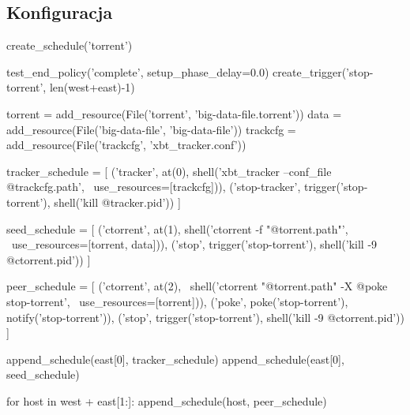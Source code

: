 \documentclass[00-praca-magisterska.tex]{subfiles}
\begin{document}

\subsection{Konfiguracja}


\begin{pythoncode}
  create_schedule('torrent')
    
  test_end_policy('complete', setup_phase_delay=0.0)
  create_trigger('stop-torrent', len(west+east)-1)
\end{pythoncode}

\begin{pythoncode}
  torrent = add_resource(File('torrent', 'big-data-file.torrent'))
  data    = add_resource(File('big-data-file',    'big-data-file'))
  trackcfg = add_resource(File('trackcfg', 'xbt_tracker.conf'))
\end{pythoncode}

\begin{pythoncode}
  tracker_schedule = [
      ('tracker', at(0), shell('xbt_tracker --conf_file @{trackcfg.path}', \
          use_resources=[trackcfg])),
      ('stop-tracker', trigger('stop-torrent'), shell('kill @{tracker.pid}'))
  ]
\end{pythoncode}

\begin{pythoncode}
  seed_schedule = [ 
      ('ctorrent', at(1), shell('ctorrent -f "@{torrent.path}"', \
          use_resources=[torrent, data])),
      ('stop', trigger('stop-torrent'), shell('kill -9 @{ctorrent.pid}'))
  ]
\end{pythoncode}

\begin{pythoncode}
  peer_schedule = [
      ('ctorrent', at(2), \
          shell('ctorrent "@{torrent.path}" -X @{poke stop-torrent}', \
          use_resources=[torrent])),
      ('poke', poke('stop-torrent'), notify('stop-torrent')),
      ('stop', trigger('stop-torrent'), shell('kill -9 @{ctorrent.pid}'))
  ]
\end{pythoncode}

\begin{pythoncode}
  append_schedule(east[0], tracker_schedule)
  append_schedule(east[0], seed_schedule)

  for host in west + east[1:]:
      append_schedule(host, peer_schedule)
\end{pythoncode}
\end{document}
